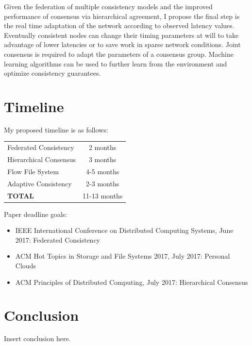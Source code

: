 \documentclass{article}
\begin{document}
Given the federation of multiple consistency models and the improved performance of consensus via hierarchical agreement, I propose the final step is the real time adaptation of the network according to observed latency values. Eventually consistent nodes can change their timing parameters at will to take advantage of lower latencies or to save work in sparse network conditions. Joint consensus is required to adapt the parameters of a consensus group. Machine learning algorithms can be used to further learn from the environment and optimize consistency guarantees.

\section{Timeline}

My proposed timeline is as follows:

\begin{center}
\begin{tabular}{|l|c|}
\hline
Federated Consistency & 2 months \\
Hierarchical Consensus & 3 months \\
Flow File System & 4-5 months \\
Adaptive Consistency & 2-3 months \\
\hline
\textbf{TOTAL} & 11-13 months \\
\hline
\end{tabular}
\end{center}

Paper deadline goals:

\begin{itemize}
\item IEEE International Conference on Distributed Computing Systems, June 2017: Federated Consistency
\item ACM Hot Topics in Storage and File Systems 2017, July 2017: Personal Clouds
\item ACM Principles of Distributed Computing, July 2017: Hierarchical Consensus
\end{itemize}

\section{Conclusion}

Insert conclusion here.

\newpage
\end{document}
